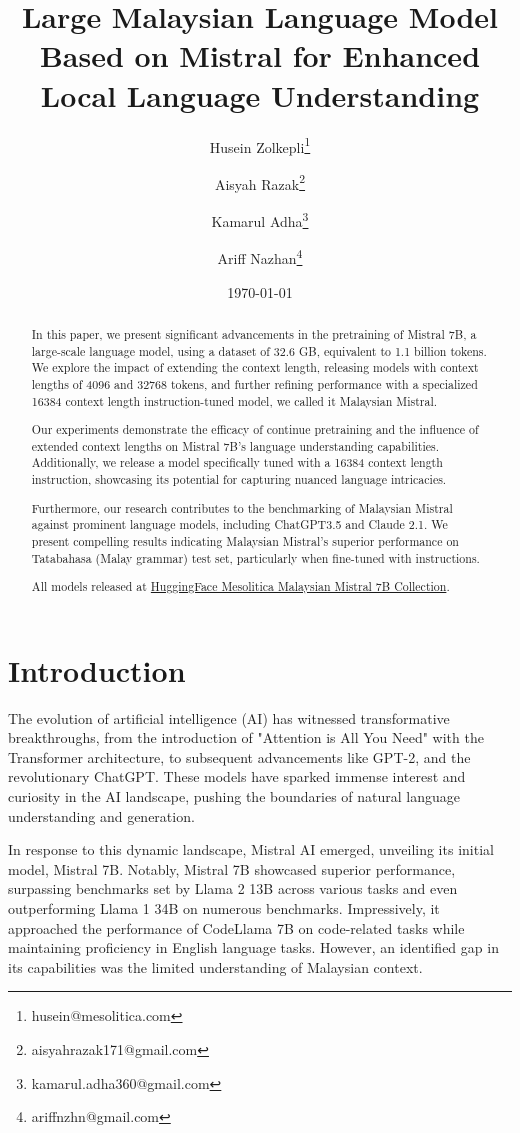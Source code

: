 \documentclass{article}
\title{Large Malaysian Language Model Based on Mistral for Enhanced Local Language Understanding}
\author{
  Husein Zolkepli\thanks{husein@mesolitica.com} \and 
  Aisyah Razak\thanks{aisyahrazak171@gmail.com} \and
  Kamarul Adha\thanks{kamarul.adha360@gmail.com} \and
  Ariff Nazhan\thanks{ariffnzhn@gmail.com}
}
\date{\today}
\begin{document}
\maketitle

\begin{abstract}
  In this paper, we present significant advancements in the pretraining of Mistral 7B, a large-scale language model, using a dataset of 32.6 GB, equivalent to 1.1 billion tokens. We explore the impact of extending the context length, releasing models with context lengths of 4096 and 32768 tokens, and further refining performance with a specialized 16384 context length instruction-tuned model, we called it Malaysian Mistral.

  Our experiments demonstrate the efficacy of continue pretraining and the influence of extended context lengths on Mistral 7B's language understanding capabilities. Additionally, we release a model specifically tuned with a 16384 context length instruction, showcasing its potential for capturing nuanced language intricacies.

  Furthermore, our research contributes to the benchmarking of Malaysian Mistral against prominent language models, including ChatGPT3.5 and Claude 2.1. We present compelling results indicating Malaysian Mistral's superior performance on Tatabahasa (Malay grammar) test set, particularly when fine-tuned with instructions.

  All models released at \href{https://huggingface.co/collections/mesolitica/malaysian-mistral-7b-6528f2ec825f4bba46c1700c}{HuggingFace Mesolitica Malaysian Mistral 7B Collection}.
\end{abstract}

\section{Introduction}
The evolution of artificial intelligence (AI) has witnessed transformative breakthroughs, from the introduction of "Attention is All You Need" with the Transformer architecture, to subsequent advancements like GPT-2, and the revolutionary ChatGPT. These models have sparked immense interest and curiosity in the AI landscape, pushing the boundaries of natural language understanding and generation.

In response to this dynamic landscape, Mistral AI emerged, unveiling its initial model, Mistral 7B. Notably, Mistral 7B showcased superior performance, surpassing benchmarks set by Llama 2 13B across various tasks and even outperforming Llama 1 34B on numerous benchmarks. Impressively, it approached the performance of CodeLlama 7B on code-related tasks while maintaining proficiency in English language tasks. However, an identified gap in its capabilities was the limited understanding of Malaysian context.
\end{document}
